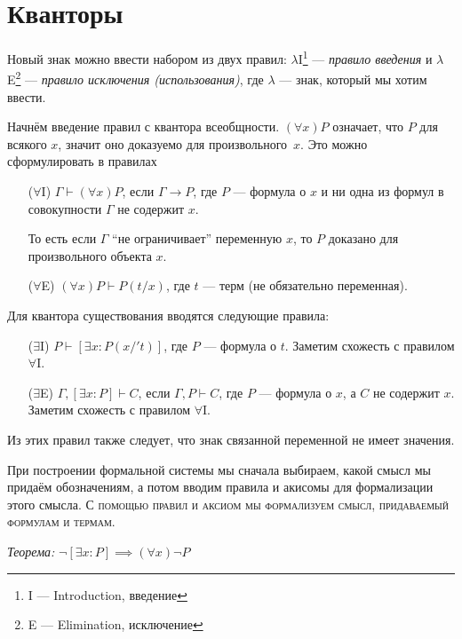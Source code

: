 \section{Кванторы}

\newcommand\Aii{$\forall$I}
\newcommand\Aee{$\forall$E}
\newcommand\Eii{$\exists$I}
\newcommand\Eee{$\exists$E}

Новый знак можно ввести набором из двух правил:
$\lambda$I\footnote{I --- Introduction, введение} --- {\it правило введения}
и $\lambda$E\footnote{E --- Elimination, исключение} --- {\it правило
исключения (использования)}, где $\lambda$ --- знак, который мы хотим ввести.

Начнём введение правил с квантора всеобщности. $(\forall x)P$ означает, что $P$ для
всякого $x$, значит оно доказуемо для произвольного~$x$. Это можно сформулировать
в правилах
\begin{enumerate}
	\item[(\Aii{})]{}$\Gamma\vdash(\forall x)P$, если ${\Gamma\to P}$, где
	$P$ --- формула о $x$ и ни одна из формул в совокупности $\Gamma$
	не содержит $x$.

	То есть если $\Gamma$ ``не ограничивает'' переменную $x$,
	то $P$ доказано для произвольного объекта $x$.

	\item[(\Aee{})]{}$(\forall x)P\vdash P(t/x)$, где $t$ --- терм
	(не обязательно переменная).
\end{enumerate}

Для квантора существования вводятся следующие правила:
\begin{enumerate}
	\item[(\Eii{})]${P\vdash [\exists x:P(x/'t)]}$, где $P$ --- формула о $t$.
	Заметим схожесть с правилом $\forall$I.

	\item[(\Eee{})]${\Gamma, [\exists x:P]\vdash C}$, если $\Gamma, P\vdash C$,
	где $P$ --- формула о $x$, а $C$ не содержит $x$.
	Заметим схожесть с правилом $\forall$I.
\end{enumerate}

Из этих правил также следует, что знак связанной переменной не имеет значения.

При построении формальной системы мы сначала
выбираем, какой смысл мы придаём обозначениям, а потом вводим
правила и акисомы для формализации этого смысла.
\textsc{С помощью правил и аксиом мы формализуем смысл, придаваемый формулам и термам.}

{\it Теорема:} $\lnot [\exists x:P]\implies  (\forall x)\lnot P$

